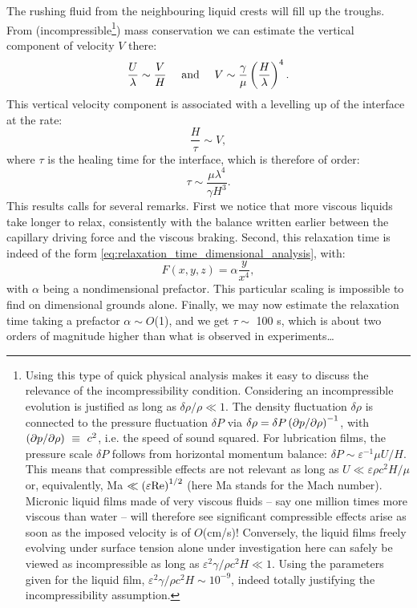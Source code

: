 The rushing fluid from the neighbouring liquid crests will fill up the troughs. From (incompressible\footnote{Using this type of quick physical analysis makes it easy to discuss the relevance of the incompressibility condition. Considering an incompressible evolution is justified as long as $\delta \rho/\rho \ll 1$. The density fluctuation $\delta \rho$ is connected to the pressure fluctuation $\delta P$ via $\delta \rho = \delta P \left(\partial p/\partial \rho\right)^{-1}$, with $\left(\partial p/\partial \rho\right)~\equiv~c^2$, i.e. the speed of sound squared. For lubrication films, the pressure scale $\delta P$ follows from horizontal momentum balance: $\delta P \sim \varepsilon^{-1} \mu U / H$. This means that compressible effects are not relevant as long as $U \ll \varepsilon \rho c^2 H / \mu$ or, equivalently, Ma $\ll \left(\varepsilon \text{Re}\right)^{1/2}$ (here Ma stands for the Mach number). Micronic liquid films made of very viscous fluids -- say one million times more viscous than water -- will therefore see significant compressible effects arise as soon as the imposed velocity is of $O$(cm/s)! Conversely, the liquid films freely evolving under surface tension alone under investigation here can safely be viewed as incompressible as long as $\varepsilon^2 \gamma / \rho c^2 H \ll 1$. Using the parameters given for the liquid film, $\varepsilon^2 \gamma / \rho c^2 H \sim 10^{-9}$, indeed totally justifying the incompressibility assumption.}) mass conservation we can estimate the vertical component of velocity $V$ there:
\begin{equation}
\frac{U}{\lambda} \sim \frac{V}{H} \quad\text{ and }\quad V \sim \frac{\gamma}{\mu}\left(\frac{H}{\lambda}\right)^4.
\end{equation}
This vertical velocity component is associated with a levelling up of the interface at the rate:
\begin{equation}
\frac{H}{\tau} \sim V,
\end{equation}
where $\tau$ is the healing time for the interface, which is therefore of order:
\begin{equation}
\tau \sim \frac{\mu \lambda^4}{\gamma H^3}.
\label{eq:quick_prediction_tau}
\end{equation}
This results calls for several remarks. First we notice that more viscous liquids take longer to relax, consistently with the balance written earlier between the capillary driving force and the viscous braking. Second, this relaxation time is indeed of the form \eqref{eq:relaxation_time_dimensional_analysis}, with:
\begin{equation}
F(x,y,z) = \alpha \frac{y}{x^4},
\end{equation}
with $\alpha$ being a nondimensional prefactor. This particular scaling is impossible to find on dimensional grounds alone. Finally, we may now estimate the relaxation time taking a prefactor $\alpha \sim O$(1), and we get $\tau \sim$ 100 s, which is about two orders of magnitude higher than what is observed in experiments\dots

